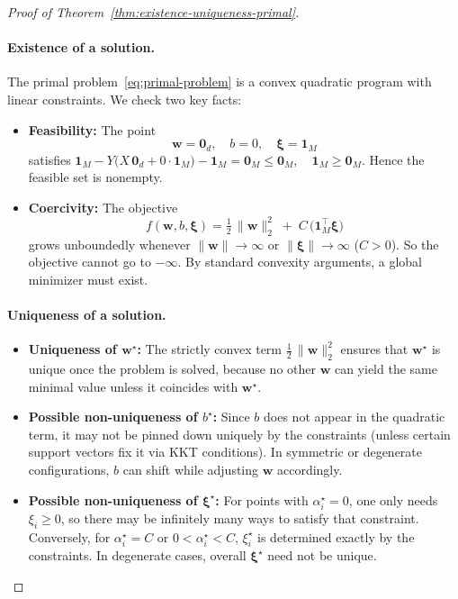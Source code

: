 \begin{proof}[Proof of Theorem~\ref{thm:existence-uniqueness-primal}]
  \paragraph{Existence of a solution.}
  The primal problem~\eqref{eq:primal-problem} is a convex quadratic program with linear constraints. We check two key facts:
  \begin{itemize}
    \item \textbf{Feasibility:} The point
    \[
      \symbf{w} = \symbf{0}_d,\quad
      b = 0,\quad
      \symbf{\xi} = \symbf{1}_M
    \]
    satisfies
    \(
      \symbf{1}_M - Y\bigl(X\,\symbf{0}_d + 0\cdot\symbf{1}_M\bigr) - \symbf{1}_M = \symbf{0}_M \le \symbf{0}_M,
      \quad
      \symbf{1}_M \ge \symbf{0}_M.
    \)
    Hence the feasible set is nonempty.
    \item \textbf{Coercivity:} The objective
    \[
       f(\symbf{w},b,\symbf{\xi}) 
       = \tfrac12\,\|\symbf{w}\|_2^2 
         \;+\; C\,\bigl(\symbf{1}_M^\top \symbf{\xi}\bigr)
    \]
    grows unboundedly whenever $\|\symbf{w}\|\to\infty$ or $\|\symbf{\xi}\|\to\infty$ ($C>0$). So the objective cannot go to $-\infty.$ By standard convexity arguments, a global minimizer must exist.
  \end{itemize}

  \paragraph{Uniqueness of a solution.}
  \begin{itemize}
    \item \textbf{Uniqueness of $\symbf{w}^\star$:}
    The strictly convex term $\tfrac12\,\|\symbf{w}\|_2^2$ ensures that $\symbf{w}^\star$ is unique once the problem is solved, because no other $\symbf{w}$ can yield the same minimal value unless it coincides with $\symbf{w}^\star$.
    \item \textbf{Possible non-uniqueness of $b^\star$:}
    Since $b$ does not appear in the quadratic term, it may not be pinned down uniquely by the constraints (unless certain support vectors fix it via KKT conditions). In symmetric or degenerate configurations, $b$ can shift while adjusting $\symbf{w}$ accordingly.
    \item \textbf{Possible non-uniqueness of $\symbf{\xi}^\star$:}
    For points with $\alpha_i^\star=0$, one only needs $\xi_i \ge 0$, so there may be infinitely many ways to satisfy that constraint. Conversely, for $\alpha_i^\star = C$ or $0<\alpha_i^\star<C$, $\xi_i^\star$ is determined exactly by the constraints. In degenerate cases, overall $\symbf{\xi}^\star$ need not be unique.
  \end{itemize}
\end{proof}


